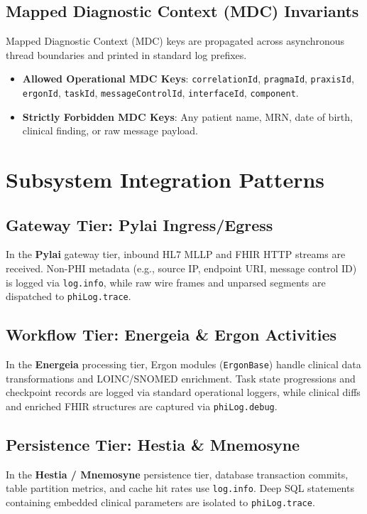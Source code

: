 \subsection{Mapped Diagnostic Context (MDC) Invariants}

Mapped Diagnostic Context (MDC) keys are propagated across asynchronous thread boundaries and printed in standard log prefixes.
\begin{itemize}
    \item \textbf{Allowed Operational MDC Keys}: \texttt{correlationId}, \texttt{pragmaId}, \texttt{praxisId}, \texttt{ergonId}, \texttt{taskId}, \texttt{messageControlId}, \texttt{interfaceId}, \texttt{component}.
    \item \textbf{Strictly Forbidden MDC Keys}: Any patient name, MRN, date of birth, clinical finding, or raw message payload.
\end{itemize}

\section{Subsystem Integration Patterns}
\label{sec:phi_subsystem_integration}

\subsection{Gateway Tier: Pylai Ingress/Egress}
In the \textbf{Pylai} gateway tier, inbound HL7 MLLP and FHIR HTTP streams are received. Non-PHI metadata (e.g., source IP, endpoint URI, message control ID) is logged via \texttt{log.info}, while raw wire frames and unparsed segments are dispatched to \texttt{phiLog.trace}.

\subsection{Workflow Tier: Energeia \& Ergon Activities}
In the \textbf{Energeia} processing tier, Ergon modules (\texttt{ErgonBase}) handle clinical data transformations and LOINC/SNOMED enrichment. Task state progressions and checkpoint records are logged via standard operational loggers, while clinical diffs and enriched FHIR structures are captured via \texttt{phiLog.debug}.

\subsection{Persistence Tier: Hestia \& Mnemosyne}
In the \textbf{Hestia / Mnemosyne} persistence tier, database transaction commits, table partition metrics, and cache hit rates use \texttt{log.info}. Deep SQL statements containing embedded clinical parameters are isolated to \texttt{phiLog.trace}.

